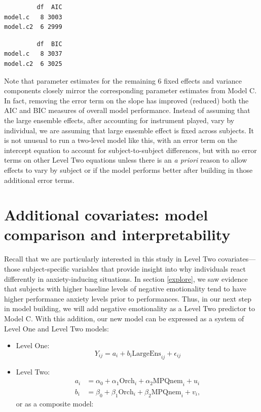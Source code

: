 \documentclass[
]{krantz}
\begin{document}
\begin{verbatim}
         df  AIC
model.c   8 3003
model.c2  6 2999
\end{verbatim}

\begin{verbatim}
         df  BIC
model.c   8 3037
model.c2  6 3025
\end{verbatim}

Note that parameter estimates for the remaining 6 fixed effects and variance components closely mirror the corresponding parameter estimates from Model C. In fact, removing the error term on the slope has improved (reduced) both the AIC and BIC measures of overall model performance. Instead of assuming that the large ensemble effects, after accounting for instrument played, vary by individual, we are assuming that large ensemble effect is fixed across subjects. It is not unusual to run a two-level model like this, with an error term on the intercept equation to account for subject-to-subject differences, but with no error terms on other Level Two equations unless there is an \emph{a priori} reason to allow effects to vary by subject or if the model performs better after building in those additional error terms.

\hypertarget{sec:modeld}{%
\section{Additional covariates: model comparison and interpretability}\label{sec:modeld}}

Recall that we are particularly interested in this study in Level Two covariates---those subject-specific variables that provide insight into why individuals react differently in anxiety-inducing situations. In section \ref{explore}, we saw evidence that subjects with higher baseline levels of negative emotionality tend to have higher performance anxiety levels prior to performances. Thus, in our next step in model building, we will add negative emotionality as a Level Two predictor to Model C. With this addition, our new model can be expressed as a system of Level One and Level Two models:

\begin{itemize}
\item
  Level One:
  \begin{equation*}
  Y_{ij} = a_{i}+b_{i}\textrm{LargeEns}_{ij}+\epsilon_{ij}
  \end{equation*}
\item
  Level Two:
  \begin{align*}
  a_{i} & = \alpha_{0}+\alpha_{1}\textrm{Orch}_{i}+\alpha_{2}\textrm{MPQnem}_{i}+u_{i} \\
  b_{i} & = \beta_{0}+\beta_{1}\textrm{Orch}_{i}+\beta_{2}\textrm{MPQnem}_{i}+v_{i},
  \end{align*}
  or as a composite model:
\end{itemize}
\end{document}
